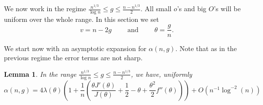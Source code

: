 \documentclass[a4paper,12pt]{article}
\newtheorem{lemma}[theorem]{Lemma}
\theoremstyle{definition}
\newcommand{\bigO}[1]{O\left({#1}\right)}
\newcommand{\err}{\bigO{n^{-1}\log^{-2}(n)}}
\begin{document}
We now work in the regime $\frac{n^{1/3}}{\log n}\leq g\leq \frac{n-n^{1/3}}{2}$. All small $o$'s and big $O$'s will be uniform over the whole range. In this section we set 
\[
    v=n-2g \qquad \text{ and } \qquad \theta=\frac{g}{n}.
\]

We start now with an asymptotic expansion for $\alpha(n,g)$.
Note that as in the previous regime the error terms are not sharp.

\begin{lemma}\label{lem_alpha_intermediate}
In the range $\frac{n^{1/3}}{\log n}\leq g\leq \frac{n-n^{1/3}}{2}$, we have, uniformly
    \[\alpha(n,g)= 4\lambda(\theta)\left(1+\frac{1}{n}\left(\frac{\theta J'\left(\theta\right)}{J\left(\theta\right)}+\frac{1}{2}-{\theta}+\frac{\theta^2}{2}f''(\theta)\right)\right)+\err\]
\end{lemma}
\end{document}
